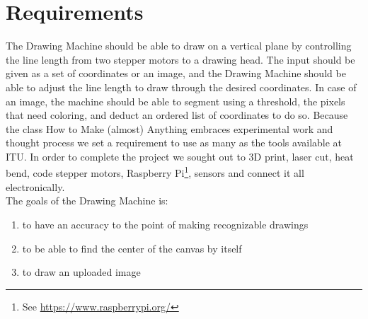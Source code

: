 
\section{Requirements}
The Drawing Machine should be able to draw on a vertical plane by controlling the line length from two stepper motors to a drawing head. The input should be given as a set of coordinates or an image, and the Drawing Machine should be able to adjust the line length to draw through the desired coordinates. In case of an image, the machine should be able to segment using a threshold, the pixels that need coloring, and deduct an ordered list of coordinates to do so. Because the class How to Make (almost) Anything embraces experimental work and thought process we set a requirement to use as many as the tools available at ITU. In order to complete the project we sought out to 3D print, laser cut, heat bend, code stepper motors, Raspberry Pi\footnote{See \url{https://www.raspberrypi.org/}}, sensors and connect it all electronically.\\
The goals of the Drawing Machine is:
\begin{enumerate}
    \item to have an accuracy to the point of making recognizable drawings\\
    \item to be able to find the center of the canvas by itself\\
    \item to draw an uploaded image \\
\end{enumerate}